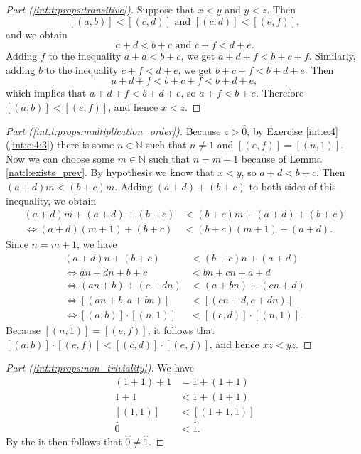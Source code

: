 \begin{proof}[Part (\ref{int:t:props:transitive})]
	Suppose that $x < y$ and $y < z$. Then
	\[
		[(a, b)] < [(c, d)] \text{ and } [(c, d)] < [(e, f)],
	\]
	and we obtain
	\[
		a + d < b + c \text{ and } c + f < d + e.
	\]
	Adding $f$ to the inequality $a + d < b + c$, we get $a + d + f < b + c + f$. Similarly, adding $b$ to the inequality $c + f < d + e$, we get $b + c + f < b + d + e$. Then
	\[
		a + d + f < b + c + f < b + d + e,
	\]
	which implies that $a + d + f < b + d + e$, so $a + f < b + e$. Therefore $[(a, b)] < [(e, f)]$, and hence $x < z$.
\end{proof}

\begin{proof}[Part (\ref{int:t:props:multiplication_order})]
	Because $z > \hat{0}$, by Exercise \ref{int:e:4} (\ref{int:e:4:3}) there is some $n \in \mathbb{N}$ such that $n \not= 1$ and $[(e, f)] = [(n, 1)]$. Now we can choose some $m \in \mathbb{N}$ such that $n = m + 1$ because of Lemma \ref{nat:l:exists_prev}. By hypothesis we know that $x < y$, so $a + d < b + c$. Then $(a + d)m < (b + c)m$. Adding $(a + d) + (b + c)$ to both sides of this inequality, we obtain
	\begin{align*}
		(a + d)m + (a + d) + (b + c)  & < (b + c)m + (a + d) + (b + c) \\
		\iff (a + d)(m + 1) + (b + c) & < (b + c)(m + 1) + (a + d).
	\end{align*}
	Since $n = m + 1$, we have
	\begin{align*}
		(a + d)n + (b + c)           & < (b + c)n + (a + d)       \\
		\iff a n + d n + b + c       & < b n + c n + a + d        \\
		\iff (a n + b) + (c + d n)   & < (a + b n) + (c n + d)    \\
		\iff [(a n + b, a + b n)]    & < [(c n + d, c + d n)]     \\
		\iff [(a, b)] \cdot [(n, 1)] & < [(c, d)] \cdot [(n, 1)].
	\end{align*}
	Because $[(n, 1)] = [(e, f)]$, it follows that $[(a, b)] \cdot [(e, f)] < [(c, d)] \cdot [(e, f)]$, and hence $x z < y z$.
\end{proof}

\begin{proof}[Part (\ref{int:t:props:non_triviality})]
	We have
	\begin{align*}
		(1 + 1) + 1 & = 1 + (1 + 1)  \\
		1 + 1       & < 1 + (1 + 1)  \\
		[(1, 1)]    & < [(1 + 1, 1)] \\
		\hat{0}     & < \hat{1}.
	\end{align*}
	By the  it then follows that $\hat{0} \not= \hat{1}$.
\end{proof}


